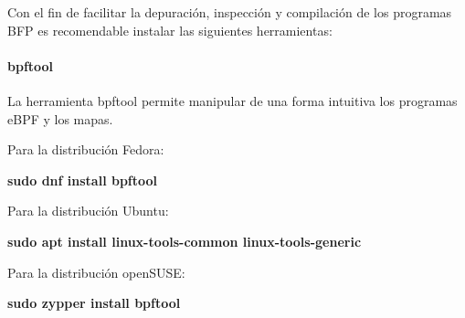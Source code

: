 Con el fin de facilitar la depuración, inspección y compilación de los programas BFP es recomendable instalar las siguientes herramientas:
\paragraph{bpftool}
La herramienta bpftool permite manipular de una forma intuitiva los programas eBPF y los mapas.

Para la distribución Fedora:
\begin{center}
    \textbf{sudo dnf install bpftool}
\end{center}

Para la distribución Ubuntu:
\begin{center}
    \textbf{sudo apt install linux-tools-common linux-tools-generic}
\end{center}

Para la distribución openSUSE:

\begin{center}
    \textbf{sudo zypper install bpftool}
\end{center}
